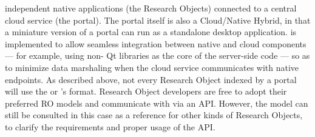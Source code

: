 \documentclass[10pt,letterpaper]{article}
\begin{document}
independent native applications (the {\RAK} 
Research Objects) connected to a central 
cloud service (the {\MOSAIC} portal).  The portal 
itself is also a Cloud/Native Hybrid, in that a 
miniature version of a {\MOSAIC} portal can run 
as a standalone desktop application.  {\lfMOSAIC} 
is implemented to allow seamless integration between 
native and cloud components --- for example, 
using non-{\GUI} Qt libraries as the core of the 
server-side code --- so as to minimize data 
marshaling when the cloud service 
communicates with native endpoints.
\p{}
As described above, not every Research Object indexed 
by a {\MOSAIC} portal will use the {\MOSAIC} {\SDK} or 
{\MOSAIC}'s {\RAK} format.  Research Object developers are 
free to adopt their preferred RO models and 
communicate with {\MOSAIC} via an API.  However, 
the {\RAK} model can still be consulted in this case as a 
reference for other kinds of Research Objects, 
to clarify the requirements and 
proper usage of the {\MOSAIC} API.
\p{}
\end{document}
